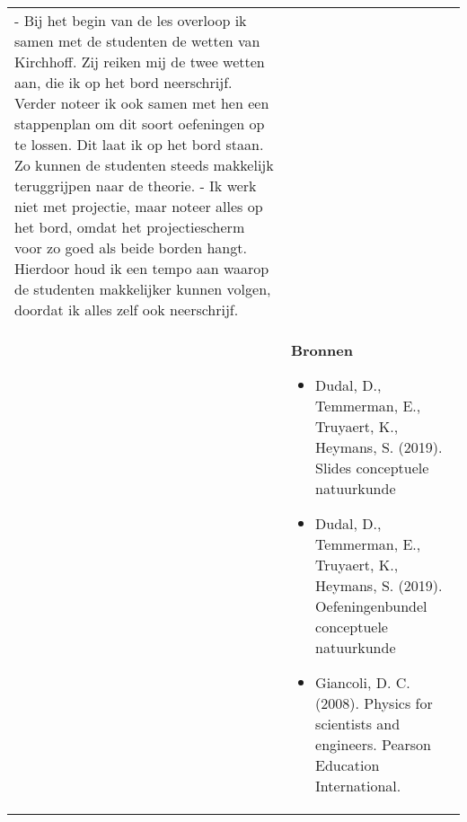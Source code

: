 \begin{landscape}
\begin{tabularx}{1.56\textwidth}{|p{}|X|}
		- Bij het begin van de les overloop ik samen met de studenten de wetten van Kirchhoff. Zij reiken mij de twee wetten aan, die ik op het bord neerschrijf. Verder noteer ik ook samen met hen een stappenplan om dit soort oefeningen op te lossen. Dit laat ik op het bord staan. Zo kunnen de studenten steeds makkelijk teruggrijpen naar de theorie. \newline\newline
		- Ik werk niet met projectie, maar noteer alles op het bord, omdat het projectiescherm voor zo goed als beide borden hangt. Hierdoor houd ik een tempo aan waarop de studenten makkelijker kunnen volgen, doordat ik alles zelf ook neerschrijf.  
		
		\\ \cline{2-2}
		& \textbf{Bronnen}\begin{itemize}
			\item Dudal, D., Temmerman, E., Truyaert, K., Heymans, S. (2019). Slides conceptuele natuurkunde
			\item Dudal, D., Temmerman, E., Truyaert, K., Heymans, S. (2019). Oefeningenbundel conceptuele natuurkunde
			\item Giancoli, D. C. (2008). Physics for scientists and engineers. Pearson Education International.
		\end{itemize}\\ \hline
	\end{tabularx}
\newpage
	


\end{landscape}
